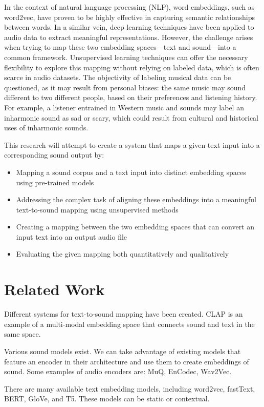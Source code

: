 \documentclass[twoside,a4paper]{article}
\begin{document}
In the context of natural language processing (NLP), word embeddings, such as word2vec, have proven to be highly effective in capturing semantic relationships between words. In a similar vein, deep learning techniques have been applied to audio data to extract meaningful representations. However, the challenge arises when trying to map these two embedding spaces—text and sound—into a common framework. Unsupervised learning techniques can offer the necessary flexibility to explore this mapping without relying on labeled data, which is often scarce in audio datasets. The objectivity of labeling musical data can be questioned, as it may result from personal biases: the same music may sound different to two different people, based on their preferences and listening history. For example, a listener entrained in Western music and sounds may label an inharmonic sound as sad or scary, which could result from cultural and historical uses of inharmonic sounds.

This research will attempt to create a system that maps a given text input into a corresponding sound output by:
\begin{itemize}
    \item Mapping a sound corpus and a text input into distinct embedding spaces using pre-trained models
    \item Addressing the complex task of aligning these embeddings into a meaningful text-to-sound mapping using unsupervised methods
    \item Creating a mapping between the two embedding spaces that can convert an input text into an output audio file
    \item Evaluating the given mapping both quantitatively and qualitatively
\end{itemize}

\section{Related Work}
Different systems for text-to-sound mapping have been created. CLAP is an example of a multi-modal embedding space that connects sound and text in the same space.

Various sound models exist. We can take advantage of existing models that feature an encoder in their architecture and use them to create embeddings of sound. Some examples of audio encoders are: MuQ, EnCodec, Wav2Vec.

There are many available text embedding models, including word2vec, fastText, BERT, GloVe, and T5. These models can be static or contextual.
\end{document}
